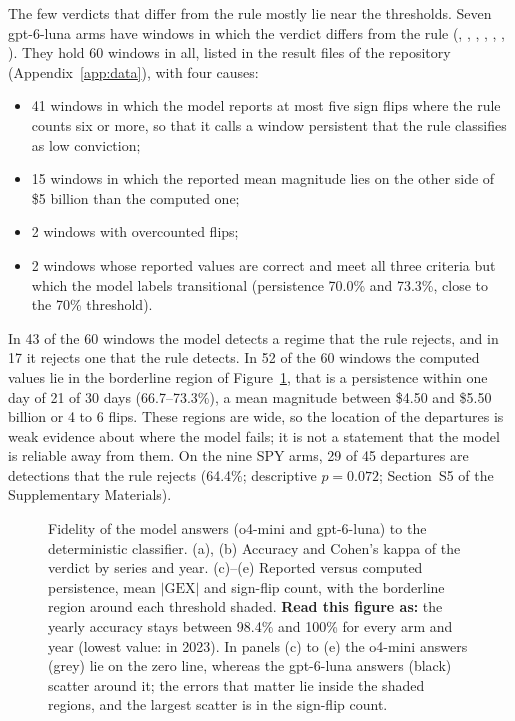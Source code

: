 The few verdicts that differ from the rule mostly lie near the thresholds. Seven gpt-6-luna arms have windows in which the verdict differs from the rule (, , , , , , ). They hold 60 windows in all, listed in the result files of the repository (Appendix~\ref{app:data}), with four causes:
\begin{itemize}
\item 41 windows in which the model reports at most five sign flips where the rule counts six or more, so that it calls a window persistent that the rule classifies as low conviction;
\item 15 windows in which the reported mean magnitude lies on the other side of \$5 billion than the computed one;
\item 2 windows with overcounted flips;
\item 2 windows whose reported values are correct and meet all three criteria but which the model labels transitional (persistence 70.0\% and 73.3\%, close to the 70\% threshold).
\end{itemize}
In 43 of the 60 windows the model detects a regime that the rule rejects, and in 17 it rejects one that the rule detects.
In 52 of the 60 windows the computed values lie in the borderline region of Figure~\ref{fig:fidelity}, that is a persistence within one day of 21 of 30 days (66.7--73.3\%), a mean magnitude between \$4.50 and \$5.50 billion or 4 to 6 flips. These regions are wide, so the location of the departures is weak evidence about where the model fails; it is not a statement that the model is reliable away from them. On the nine SPY arms, 29 of 45 departures are detections that the rule rejects (64.4\%; descriptive $p=0.072$; Section~S5 of the Supplementary Materials).

\begin{figure}[!htbp]
\centering
\resultfigure{\figFidelity}
\caption{Fidelity of the model answers (o4-mini and gpt-6-luna) to the deterministic classifier. (a), (b) Accuracy and Cohen's kappa of the verdict by series and year. (c)--(e) Reported versus computed persistence, mean $|\mathrm{GEX}|$ and sign-flip count, with the borderline region around each threshold shaded. \textbf{Read this figure as:} the yearly accuracy stays between 98.4\% and 100\% for every arm and year (lowest value:  in 2023). In panels (c) to (e) the o4-mini answers (grey) lie on the zero line, whereas the gpt-6-luna answers (black) scatter around it; the errors that matter lie inside the shaded regions, and the largest scatter is in the sign-flip count.}
\label{fig:fidelity}
\end{figure}
